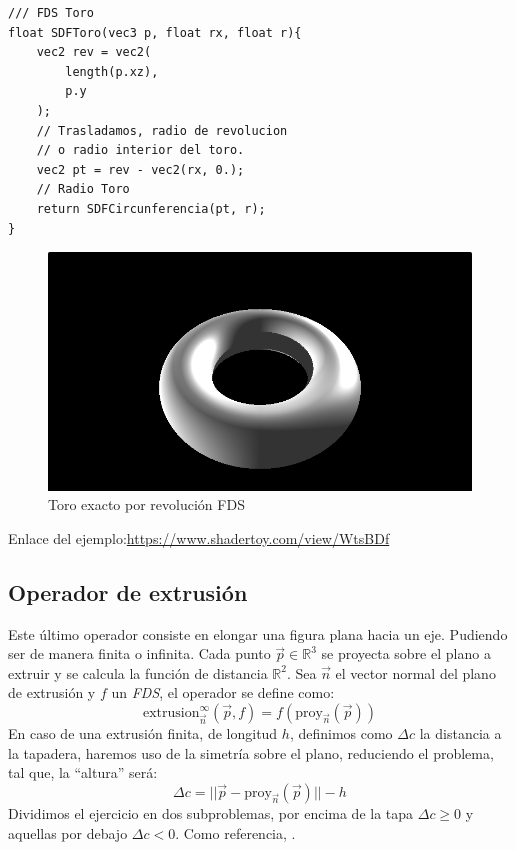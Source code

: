 \begin{lstlisting}
/// FDS Toro
float SDFToro(vec3 p, float rx, float r){   
    vec2 rev = vec2(
        length(p.xz), 
        p.y
    );
    // Trasladamos, radio de revolucion
    // o radio interior del toro.
    vec2 pt = rev - vec2(rx, 0.);
    // Radio Toro
    return SDFCircunferencia(pt, r);
}
\end{lstlisting}

\begin{figure}[H]
  \centering
  \captionsetup{justification=centering}%
  \includegraphics[width=1.0\textwidth]{secciones/imagenes/sdf/3d/sdf_toro.png}
  \caption{Toro exacto por revolución FDS}
  \label{fig:torus}
\end{figure}

Enlace del ejemplo:\url{https://www.shadertoy.com/view/WtsBDf}

\subsection{Operador de extrusión}
Este último operador consiste en elongar una figura plana hacia un eje. Pudiendo ser de manera finita o infinita. Cada punto \(\Vec{p}\in\mathbb{R}^3\) se proyecta sobre el plano a extruir y se calcula la función de distancia \(\mathbb{R}^2\). Sea \(\Vec{n}\) el  vector normal del plano de extrusión y \(f\) un \textit{FDS}, el operador se define como:
\[\text{extrusion}^\infty_{\Vec{n}}\left(\Vec{p},f\right) = f\left(\text{proy}_{\Vec{n}}(\Vec{p})\right)\]
En caso de una extrusión finita, de longitud \(h\), definimos como \(\Delta c\) la distancia a la tapadera, haremos uso de la simetría sobre el plano, reduciendo el problema, tal que, la \enquote{altura} será:
\[\Delta c  =\vert\vert \Vec{p} - \text{proy}_{\Vec{n}}(\Vec{p}) \vert\vert - h\]
Dividimos el ejercicio en dos subproblemas, por encima de la tapa \(\Delta c \ge 0\) y aquellas por debajo \(\Delta c < 0\). Como referencia, .

